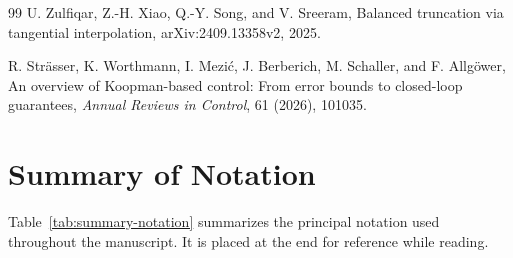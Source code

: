 \documentclass[review]{siamart220329}
\theoremstyle{definition}
\theoremstyle{remark}
\begin{document}
\begin{thebibliography}{99}
U. Zulfiqar, Z.-H. Xiao, Q.-Y. Song, and V. Sreeram, Balanced truncation via tangential interpolation, arXiv:2409.13358v2, 2025.

R. Str\"asser, K. Worthmann, I. Mezi\'c, J. Berberich, M. Schaller, and F. Allg\"ower, An overview of Koopman-based control: From error bounds to closed-loop guarantees, \emph{Annual Reviews in Control}, 61 (2026), 101035.

\end{thebibliography}

\clearpage
\section*{Summary of Notation}
Table~\ref{tab:summary-notation} summarizes the principal notation used throughout the manuscript. It is placed at the end for reference while reading.
\end{document}
